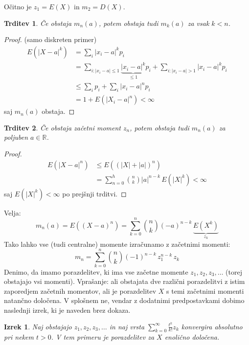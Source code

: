 \documentclass[12pt]{book}
\def\n{\noindent}
\theoremstyle{definition}
\theoremstyle{plain}
\newtheorem{izrek}{Izrek}
\theoremstyle{plain}
\newtheorem{trditev}{Trditev}
\theoremstyle{plain}
\theoremstyle{remark}
\begin{document}
\n Očitno je $z_1=E(X)$ in $m_2=D(X)$. 

\begin{trditev}
    Če obstaja $m_n(a)$, potem obstaja tudi $m_k(a)$ za vsak $k<n$.
\end{trditev}

\begin{proof}(samo diskreten primer)
    \begin{align*}
        E\left(|X-a|^k\right)&=\sum_i\left|x_i-a\right|^k  p_i \\
        &=\sum_{i: | x_i-a | \leq 1} \underbrace{\left|x_i-a\right|^k}_{\leq 1} p_i+\sum_{i: | x_i-a |  >1}\left|x_i-a\right|^k p_i \\
        &\leq \sum_i p_i+\sum_i\left|x_i-a\right|^n p_i \\
        &=1+E\left(\left|X_i-a\right|^n\right) < \infty
    \end{align*}
    saj $m_n(a)$ obstaja.
\end{proof}

\begin{trditev}
    Če obstaja začetni moment $z_n$, potem obstaja tudi $m_n(a)$ za poljuben $a \in \mathbb{R}$.
\end{trditev}

\begin{proof}
    \begin{align*}
        E\left(|X-a|^n\right) &\leq E\left((|X|+|a|)^n\right) \\
        &=\sum_{n=0}^h \binom{n}{k}|a|^{n-k} \, E\left(|X|^k\right) < \infty
    \end{align*}
    saj $E\left(|X|^k\right) < \infty$ po prejšnji trditvi.
\end{proof}

\n Velja: 
$$
m_n(a)=E\left((X-a)^n\right)=\sum_{k=0}^n\binom{n}{k}(-a)^{n-k} \, \underbrace{E\left(X^k\right)}_{z_k}
$$
Tako lahko vse (tudi centralne) momente izračunamo z začetnimi momenti: 
$$
m_n=\sum_{k=0}^n \binom{n}{k} (-1)^{n-k} \, z_1^{n-k} \, z_k
$$
Denimo, da imamo porazdelitev, ki ima vse začetne momente $z_1, z_2, z_3, \ldots$ (torej obstajajo vsi momenti). Vprašanje: ali obstajata dve različni porazdelitvi z istim zaporedjem začetnih momentov, ali je porazdelitev $X$ s temi začetnimi momenti natančno določena. V splošnem ne, vendar z dodatnimi predpostavkami dobimo naslednji izrek, ki je naveden brez dokaza. 

\begin{izrek}
    Naj obstajajo $z_1, z_2, z_3, \ldots$ in naj vrsta $\sum_{k=0}^{\infty} \frac{t^k}{k!}z_k$ konvergira absolutno pri nekem $t>0$. V tem primeru je porazdelitev za $X$ enolično določena. 
\end{izrek}
\end{document}
